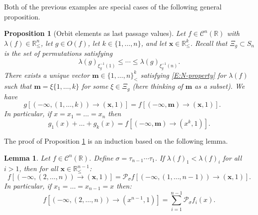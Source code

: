 \documentclass[11pt]{article}
\newcommand{\R}{\mathbb{R}}
\newcommand{\sig}{\sigma}
\newcommand{\la}{\lambda}
\newcommand{\cC}{\mathcal{C}}
\newcommand{\cP}{\mathcal{P}}
\newcommand{\bx}{\mathbf{x}}
\newcommand{\bm}{\mathbf{m}}
\newtheorem{lemma}[theorem]{Lemma}
\newtheorem{proposition}[theorem]{Proposition}
\theoremstyle{definition} %
\theoremstyle{remark} %
\begin{document}
Both of the previous examples are special cases of the following general proposition. 

\begin{proposition}[Orbit elements as last passage values]
	\label{P:orbits} Let $f \in \cC^n(\R)$ with $\la(f) \in \R^n_\le$, let $g \in O(f)$, let $k \in \{1, \dots, n\}$, and let $\bx \in \R^k_\le$. Recall that $\Xi_g \subset S_n$ is the set of permutations satisfying 
	\begin{equation}
		\label{E:lag}
		\la(g)_{\xi_g^{-1}(1)} \le \cdots \le \la(g)_{\xi_g^{-1}(n)}.
	\end{equation}
	There exists a unique vector $\bm \in \{1, \dots, n\}^k_<$ satisfying \eqref{E:N-property} for $\la(f)$ such that $\bm = \xi\{1, \dots, k\}$ for some $\xi \in \Xi_g$ (here thinking of $\bm$ as a subset). We have 
		\begin{equation}
			\label{E:g1gk}
			g[(-\infty, (1, \dots, k)) \to (\bx, 1)]=  f[(-\infty,\bm)\to (\bx,1)]. \qquad 
		\end{equation}
		In particular, if $x = x_1 = \dots = x_n$ then 
		$$
		g_1(x) + \dots + g_k(x) = f[(-\infty,\bm)\to (x^k,1)].
		$$
\end{proposition}

The proof of Proposition \ref{P:orbits} is an induction based on the following lemma. 

	\begin{lemma}\label{L:block-up}
	Let $f \in \cC^n(\R)$. Define $\sig = \tau_{n-1} \cdots \tau_1$. If $\la(f)_1 < \la(f)_i$ for all $i > 1$, then for all $\bx \in \R^{n-1}_\le$:
	\begin{equation}
	\label{E:Pitman-unnormal}
	f[(-\infty, (2,\ldots , n))\to (\bx,1)] = \cP_{\sig} f[(-\infty,(1,\ldots, n-1))\to (\bx,1)]. 
	\end{equation}
	In particular, if $x_1 = \dots = x_{n-1} = x$ then:
	\begin{equation}
		\label{E:basic-xx}
	f[(-\infty, (2,\ldots , n))\to (x^{n-1},1)] = \sum_{i=1}^{n-1}\cP_{\sig} f_i(x).
	\end{equation}
\end{lemma}
\end{document}
